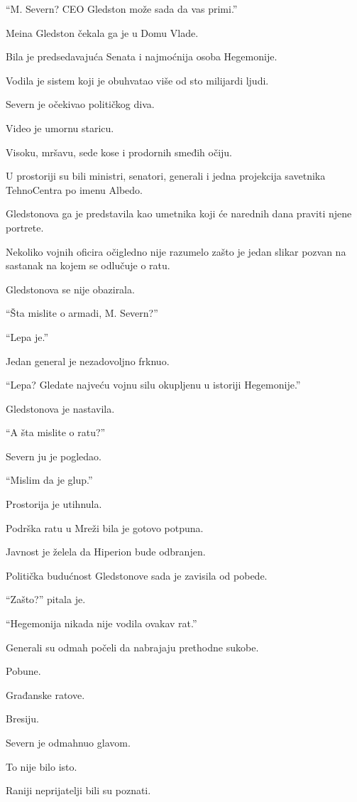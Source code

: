 ``M. Severn? CEO Gledston može sada da vas primi.''

Meina Gledston čekala ga je u Domu Vlade.

Bila je predsedavajuća Senata i najmoćnija osoba Hegemonije.

Vodila je sistem koji je obuhvatao više od sto milijardi ljudi.

Severn je očekivao političkog diva.

Video je umornu staricu.

Visoku, mršavu, sede kose i prodornih smeđih očiju.

U prostoriji su bili ministri, senatori, generali i jedna projekcija savetnika TehnoCentra po imenu Albedo.

Gledstonova ga je predstavila kao umetnika koji će narednih dana praviti njene portrete.

Nekoliko vojnih oficira očigledno nije razumelo zašto je jedan slikar pozvan na sastanak na kojem se odlučuje o ratu.

Gledstonova se nije obazirala.

``Šta mislite o armadi, M. Severn?''

``Lepa je.''

Jedan general je nezadovoljno frknuo.

``Lepa? Gledate najveću vojnu silu okupljenu u istoriji Hegemonije.''

Gledstonova je nastavila.

``A šta mislite o ratu?''

Severn ju je pogledao.

``Mislim da je glup.''

Prostorija je utihnula.

Podrška ratu u Mreži bila je gotovo potpuna.

Javnost je želela da Hiperion bude odbranjen.

Politička budućnost Gledstonove sada je zavisila od pobede.

``Zašto?'' pitala je.

``Hegemonija nikada nije vodila ovakav rat.''

Generali su odmah počeli da nabrajaju prethodne sukobe.

Pobune.

Građanske ratove.

Bresiju.

Severn je odmahnuo glavom.

To nije bilo isto.

Raniji neprijatelji bili su poznati.

